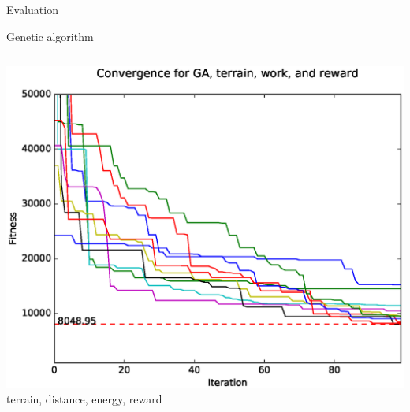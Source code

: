 \documentclass[9pt]{beamer}
\begin{document}
\begin{frame}{Evaluation}
\begin{block}{Genetic algorithm}
\begin{columns}
\begin{column}{0.5\textwidth}
\begin{center}
                    \includegraphics[width=\textwidth,trim={.75cm .75cm 0cm 1cm},clip]{img/conv_GA_b.eps}
                    \linebreak
                    terrain, distance, energy, reward
                \end{center}
            \end{column}
        \end{columns}
    \end{block}
\end{frame}
\end{document}
